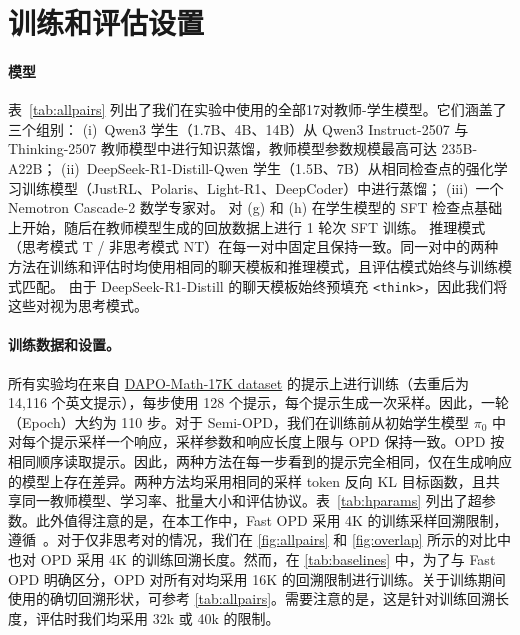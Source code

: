 
\onecolumn
\appendix
\section{训练和评估设置}


\label{app:setup}

\paragraph{模型}
表~\ref{tab:allpairs} 列出了我们在实验中使用的全部17对教师-学生模型。它们涵盖了三个组别：  
(i)~Qwen3 学生（1.7B、4B、14B）从 Qwen3 Instruct-2507 与 Thinking-2507 教师模型中进行知识蒸馏，教师模型参数规模最高可达 235B-A22B；  
(ii)~DeepSeek-R1-Distill-Qwen 学生（1.5B、7B）从相同检查点的强化学习训练模型（JustRL、Polaris、Light-R1、DeepCoder）中进行蒸馏；  
(iii)~一个 Nemotron Cascade-2 数学专家对。  
对 (g) 和 (h) 在学生模型的 SFT 检查点基础上开始，随后在教师模型生成的回放数据上进行 1 轮次 SFT 训练。  
推理模式（思考模式 T / 非思考模式 NT）在每一对中固定且保持一致。同一对中的两种方法在训练和评估时均使用相同的聊天模板和推理模式，且评估模式始终与训练模式匹配。  
由于 DeepSeek-R1-Distill 的聊天模板始终预填充 \texttt{<think>}，因此我们将这些对视为思考模式。

\paragraph{训练数据和设置。}
所有实验均在来自 \href{https://huggingface.co/datasets/open-r1/DAPO-Math-17k-Processed}{DAPO-Math-17K dataset} 的提示上进行训练（去重后为 14{,}116 个英文提示），每步使用 128 个提示，每个提示生成一次采样。因此，一轮（Epoch）大约为 110 步。对于 Semi-OPD，我们在训练前从初始学生模型 $\pi_0$ 中对每个提示采样一个响应，采样参数和响应长度上限与 OPD 保持一致。OPD 按相同顺序读取提示。因此，两种方法在每一步看到的提示完全相同，仅在生成响应的模型上存在差异。两种方法均采用相同的采样 token 反向 KL 目标函数，且共享同一教师模型、学习率、批量大小和评估协议。表~\ref{tab:hparams} 列出了超参数。此外值得注意的是，在本工作中，Fast OPD 采用 4K 的训练采样回溯限制，遵循~\citep{xu2026pass}。对于仅非思考对的情况，我们在 \cref{fig:allpairs} 和 \cref{fig:overlap} 所示的对比中也对 OPD 采用 4K 的训练回溯长度。然而，在 \cref{tab:baselines} 中，为了与 Fast OPD 明确区分，OPD 对所有对均采用 16K 的回溯限制进行训练。关于训练期间使用的确切回溯形状，可参考 \cref{tab:allpairs}。需要注意的是，这是针对训练回溯长度，评估时我们均采用 32k 或 40k 的限制。

